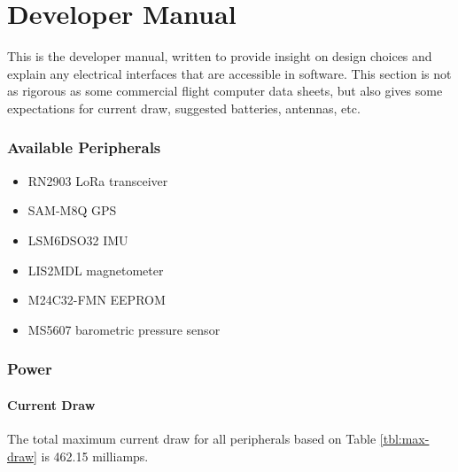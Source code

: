 \part{Developer Manual}

This is the developer manual, written to provide insight on design choices and explain any electrical interfaces that
are accessible in software. This section is not as rigorous as some commercial flight computer data sheets, but also
gives some expectations for current draw, suggested batteries, antennas, etc.

\section{Available Peripherals}

\begin{itemize}
    \item RN2903 LoRa transceiver
    \item SAM-M8Q GPS
    \item LSM6DSO32 IMU
    \item LIS2MDL magnetometer
    \item M24C32-FMN EEPROM
    \item MS5607 barometric pressure sensor
\end{itemize}

\section{Power}

\subsection{Current Draw}

The total maximum current draw for all peripherals based on Table \ref{tbl:max-draw} is 462.15 milliamps.

